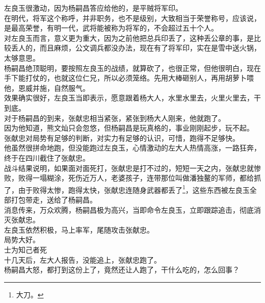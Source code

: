 \begin{multicols}{\theparacolNo}
左良玉很激动，因为杨嗣昌答应给他的，是平贼将军印。\\

在明代，将军这个称呼，并非职务，也不是级别，大致相当于荣誉称号，应该说，是最高荣誉，有明一代，武将能被称为将军的，不会超过五十个人。\\

对左良玉而言，意义更为重大，因为之前他把总兵印丢了，这种丢公章的事，是比较丢人的，而且麻烦，公文调兵都没办法，现在有了将军印，实在是雪中送火锅，太够意思。\\

杨嗣昌绝顶聪明，要按照左良玉的战绩，就算砍了，也很正常，但他很明白，现在手下能打仗的，也就这位仁兄，所以必须笼络。先用大棒砸别人，再用胡萝卜喂他，恩威并施，自然服气。\\

效果确实很好，左良玉当即表示，愿意跟着杨大人，水里水里去，火里火里去，干到底。\\

对于杨嗣昌的到来，张献忠相当紧张，紧张到杨大人刚来，他就跑了。\\

因为他知道，熊文灿只会忽悠，但杨嗣昌是玩真格的，事业刚刚起步，玩不起。\\

张献忠对局势有足够的判断，对实力有足够的认识，可惜，跑得不足够快。\\

他虽然很拼命地跑，但没能跑过左良玉，心情激动的左大人热情高涨，一路狂奔，终于在四川截住了张献忠。\\

战斗结果说明，如果面对面死打，张献忠是打不过的，短短一天之内，张献忠就惨败，败得一塌糊涂，死伤近万人，老婆孩子，连带那位叫做潘独鳌的军师，都给抓了，由于败得太惨，跑得太快，张献忠连随身武器都丢了\footnote{大刀。}，这些东西被左良玉全部打包带走，送给了杨嗣昌。\\

消息传来，万众欢腾，杨嗣昌极为高兴，当即命令左良玉，立即跟踪追击，彻底消灭张献忠。\\

左良玉依然积极，马上率军，尾随攻击张献忠。\\

局势大好。\\

士为知己者死\\

十几天后，左大人报告，没能追上，张献忠跑了。\\

杨嗣昌大怒，都打到这份上了，竟然还让人跑了，干什么吃的，怎么回事？\\


\end{multicols}
